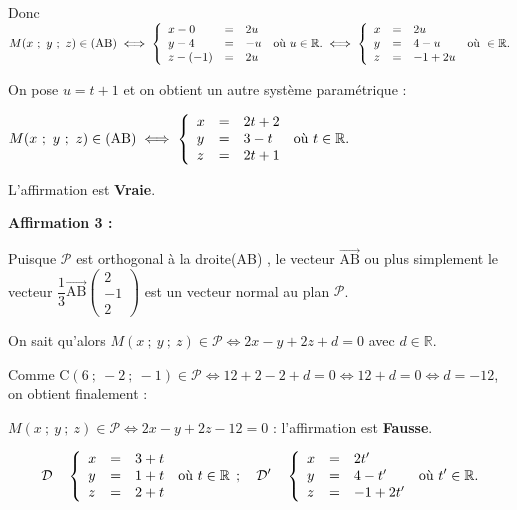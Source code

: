\documentclass[10pt]{article}
\providecommand{\R}{\mathbb{R}}
\providecommand{\vect}[1]{\overrightarrow{#1}}
\begin{document}
Donc $M(x~;~y~;~z) \in (\text{AB}) \iff \left\{\begin{array}{l c l}
x - 0&=& 2u\\
y - 4&=&  - u\\
z - (-1)&=&2u
\end{array}\right. \:\text{où } u \in \R. \iff \left\{\begin{array}{l c l}
x &=& 2u\\
y &=&4  - u\\
z &=&- 1 + 2u
\end{array}\right. \:\text{où } \in \R.$

On pose $u = t + 1$ et on obtient un autre système paramétrique :

$M(x~;~y~;~z) \in (\text{AB}) \iff \left\{\begin{array}{l c l}
x&=&2t + 2\\y &=& 3 - t\\z&=&2t + 1
\end{array}\right. \:\text{où } t \in \R.$

L'affirmation est \textbf{Vraie}.

\medskip

\textbf{Affirmation 3 :} 

Puisque $\mathcal{P}$ est orthogonal à la droite(AB) , le vecteur $\vect{\text{AB}}$ ou plus simplement le vecteur $\dfrac13\vect{\text{AB}}\begin{pmatrix}2\\-1\\2\end{pmatrix}$ est un vecteur normal au plan $\mathcal{P}$.

On sait qu'alors $M(x~;~y~;~z) \in \mathcal{P} \iff 2x - y + 2z + d = 0$ avec $d \in \R$.

Comme C$(6~;~-2~;~-1) \in \mathcal{P} \iff 12  + 2 - 2 + d = 0\iff 12 + d = 0 \iff d = - 12$, on obtient finalement :

$M(x~;~y~;~z) \in \mathcal{P} \iff 2x - y + 2z - 12= 0$ : l'affirmation  est \textbf{Fausse}.

\bigskip



\[\mathcal{D}\quad \left\{\begin{array}{l c l}
x&=&3+t\\
y&=&1+t\\
z&=&2+t
\end{array}\right. \:\text{où } t \in \R \:\:;\quad
\mathcal{D}'\quad \left\{\begin{array}{l c l}
x&= &2t'\\
y&=&4 - t'\\
z&=&-1 + 2t'
\end{array}\right. \:\text{où } t' \in \R.\]
\end{document}
